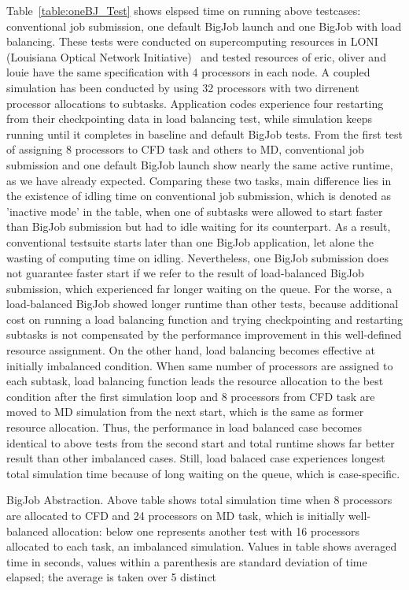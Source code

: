 \documentclass[conference,final]{IEEEtran}
\begin{document}
Table~\ref{table:oneBJ_Test} shows elspsed time on running above testcases: conventional 
job submission, one default BigJob launch and one BigJob with load balancing. These tests 
were conducted on supercomputing resources in LONI (Louisiana Optical Network 
Initiative)~\cite{LONI_web} and tested resources of eric, oliver and louie have the same 
specification with 4 processors in each node. A coupled simulation has been conducted by 
using 32 processors with two dirrenent processor allocations to subtasks. Application 
codes experience four restarting from their checkpointing data in load balancing test, 
while simulation keeps running until it completes in baseline and default BigJob tests.
From the first test of assigning 8 processors to CFD task and others to MD, conventional 
job submission and one default BigJob launch show nearly the same active runtime, as we 
have already expected. Comparing these two tasks, main difference lies in the existence 
of idling time on conventional job submission, which is denoted as 'inactive mode' in the 
table, when one of subtasks were allowed to start faster than BigJob submission but had 
to idle waiting for its counterpart. As a result, conventional testsuite starts later 
than one BigJob application, let alone the wasting of computing time on idling. 
Nevertheless, one BigJob submission does not guarantee faster start if we refer to the 
result of load-balanced BigJob submission, which experienced far longer waiting on the 
queue. For the worse, a load-balanced BigJob showed longer runtime than other tests, 
because additional cost on running a load balancing function and trying checkpointing and 
restarting subtasks is not compensated by the performance improvement in this 
well-defined resource assignment.
On the other hand, load balancing becomes effective at initially imbalanced condition. 
When same number of processors are assigned to each subtask, load balancing function 
leads the resource allocation to the best condition after the first simulation loop and 8 
processors from CFD task are moved to MD simulation from the next start, which is the 
same as former resource allocation. Thus, the performance in load balanced case becomes 
identical to above tests from the second start and total runtime shows far better result 
than other imbalanced cases. Still, load balaced case experiences longest total 
simulation time because of long waiting on the queue, which is case-specific.



BigJob Abstraction. Above table shows total simulation time when 8 processors are 
allocated to CFD and 24 processors on MD task, which is initially well-balanced 
allocation: below one represents another test with 16 processors allocated to each task, 
an imbalanced simulation. Values in table shows averaged time in seconds, values within a 
parenthesis are standard deviation of time elapsed; the average is taken over 5 distinct
\end{document}
